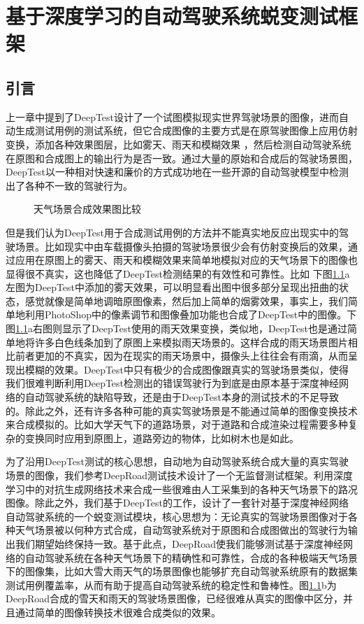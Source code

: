 \chapter{基于深度学习的自动驾驶系统蜕变测试框架}

\section{引言}

上一章中提到了DeepTest设计了一个试图模拟现实世界驾驶场景的图像，进而自动生成测试用例的测试系统，但它合成图像的主要方式是在原驾驶图像上应用仿射变换，添加各种效果图层，比如雾天、雨天和模糊效果
，然后检测自动驾驶系统在原图和合成图上的输出行为是否一致。通过大量的原始和合成后的驾驶场景图，DeepTest以一种相对快速和廉价的方式成功地在一些开源的自动驾驶模型中检测出了各种不一致的驾驶行为。

\begin{figure}[h]
    \centering
    \caption{天气场景合成效果图比较}
    \label{label-deep}
\end{figure}

但是我们认为DeepTest用于合成测试用例的方法并不能真实地反应出现实中的驾驶场景。比如现实中由车载摄像头拍摄的驾驶场景很少会有仿射变换后的效果，通过应用在原图上的雾天、雨天和模糊效果来简单地模拟对应的天气场景下的图像也显得很不真实，这也降低了DeepTest检测结果的有效性和可靠性。比如
下图\ref{label-deep}a左图为DeepTest中添加的雾天效果，可以明显看出图中很多部分呈现出扭曲的状态，感觉就像是简单地调暗原图像素，然后加上简单的烟雾效果，事实上，我们简单地利用PhotoShop中的像素调节和图像叠加功能也合成了DeepTest中的图像。下图\ref{label-deep}a右图则显示了DeepTest使用的雨天效果变换，类似地，DeepTest也是通过简单地将许多白色线条加到了原图上来模拟雨天场景的。这样合成的雨天场景图片相比前者更加的不真实，因为在现实的雨天场景中，摄像头上往往会有雨滴，从而呈现出模糊的效果。DeepTest中只有极少的合成图像跟真实的驾驶场景类似，使得我们很难判断利用DeepTest检测出的错误驾驶行为到底是由原本基于深度神经网络的自动驾驶系统的缺陷导致，还是由于DeepTest本身的测试技术的不足导致的。除此之外，还有许多各种可能的真实驾驶场景是不能通过简单的图像变换技术来合成模拟的。比如大学天气下的道路场景，对于道路和合成渲染过程需要多种复杂的变换同时应用到原图上，道路旁边的物体，比如树木也是如此。

为了沿用DeepTest测试的核心思想，自动地为自动驾驶系统合成大量的真实驾驶场景的图像，我们参考DeepRoad测试技术设计了一个无监督测试框架。利用深度学习中的对抗生成网络技术来合成一些很难由人工采集到的各种天气场景下的路况图像。除此之外，我们基于DeepTest的工作，设计了一套针对基于深度神经网络自动驾驶系统的一个蜕变测试模块，核心思想为：无论真实的驾驶场景图像对于各种天气场景被以何种方式合成，自动驾驶系统对于原图和合成图做出的驾驶行为输出我们期望始终保持一致。基于此点，DeepRoad使我们能够测试基于深度神经网络的自动驾驶系统在各种天气场景下的精确性和可靠性，合成的各种极端天气场景下的图像集，比如大雪大雨天气的场景图像也能够扩充自动驾驶系统原有的数据集测试用例覆盖率，从而有助于提高自动驾驶系统的稳定性和鲁棒性。图\ref{label-deep}b为DeepRoad合成的雪天和雨天的驾驶场景图像，已经很难从真实的图像中区分，并且通过简单的图像转换技术很难合成类似的效果。

